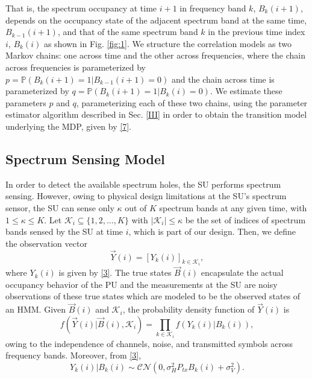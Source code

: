 \documentclass[10pt,twocolumn]{IEEEtran}
\begin{document}
That is, the spectrum occupancy at time $i+1$ in frequency band $k$, $B_{k}(i+1)$, depends on the  occupancy state of the adjacent spectrum band at the same time, $B_{k-1}(i+1)$, and that of the same spectrum band $k$ in the previous time index $i$, $B_{k}(i)$ as shown in Fig. \ref{fig:1}. We structure the correlation models as two Markov chains: one across time and the other across frequencies, where the chain across frequencies is parameterized by $p{=}\mathbb{P}(B_{k}(i+1){=}1|B_{k-1}(i+1){=}0)$ and the chain across time is parameterized by $q{=}\mathbb{P}(B_{k}(i+1){=}1|B_{k}(i){=}0)$. We estimate these parameters $p$ and $q$, parameterizing each of these two chains, using the parameter estimator algorithm described in Sec. \ref{III} in order to obtain the transition model underlying the MDP, given by \eqref{7}.
\vspace{-3mm}
\subsection{Spectrum Sensing Model}
In order to detect the available spectrum holes, the SU performs spectrum sensing. However, owing to physical design limitations at the SU's spectrum sensor, the SU can sense only $\kappa$ out of $K$ spectrum bands at any given time, with $1{\leq}\kappa{\leq}K$. Let $\mathcal K_{i}{\subseteq}\{1,2,\dots,K\}$ with $|\mathcal K_i|{\leq}\kappa$ be the set of indices of spectrum bands sensed by the SU at time $i$, which is part of our design.
Then, we define the observation vector
\begin{equation}\label{8}
    \vec{Y}(i) = [Y_k(i)]_{k {\in} \mathcal K_i},
\end{equation}
where $Y_k(i)$ is given by \eqref{3}.
The true states $\vec{B}(i)$ encapsulate the actual occupancy behavior of the PU and the measurements at the SU are noisy observations of these true states which are modeled to be the observed states of an HMM. Given $\vec{B}(i)$ and $\mathcal K_i$, the probability density function of $\vec{Y}(i)$ is
\begin{equation}\label{9}
    f(\vec{Y}(i)|\vec{B}(i), \mathcal K_i) = \prod_{k \in \mathcal K_i} f(Y_k(i)|B_k(i)),
\end{equation}
owing to the independence of channels, noise, and transmitted symbols across frequency bands. Moreover, from \eqref{3},
\begin{equation}\label{10}
 Y_k(i)|B_k(i) \sim \mathcal{CN}(0, \sigma_H^2P_{tx}B_k(i) + \sigma_V^2).
\end{equation}
\end{document}
